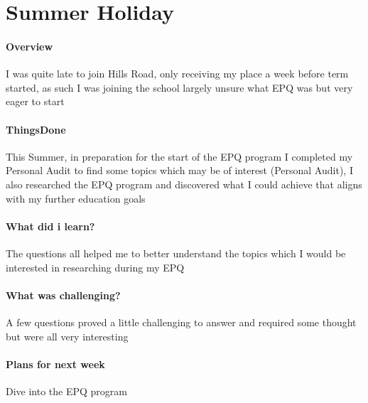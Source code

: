 \section{Summer Holiday}

\paragraph{Overview}
I was quite late to join Hills Road, only receiving my place a week before term started, as such I was joining the school largely unsure what EPQ was but very eager to start

\paragraph{ThingsDone}
This Summer, in preparation for the start of the EPQ program I completed my Personal Audit to find some topics which may be of interest (Personal Audit), I also researched the EPQ program and discovered what I could achieve that aligns with my further education goals

\paragraph{What did i learn?}
The questions all helped me to better understand the topics which I would be interested in researching during my EPQ 

\paragraph{What was challenging?}
A few questions proved a little challenging to answer and required some thought but were all very interesting

\paragraph{Plans for next week}
Dive into the EPQ program
